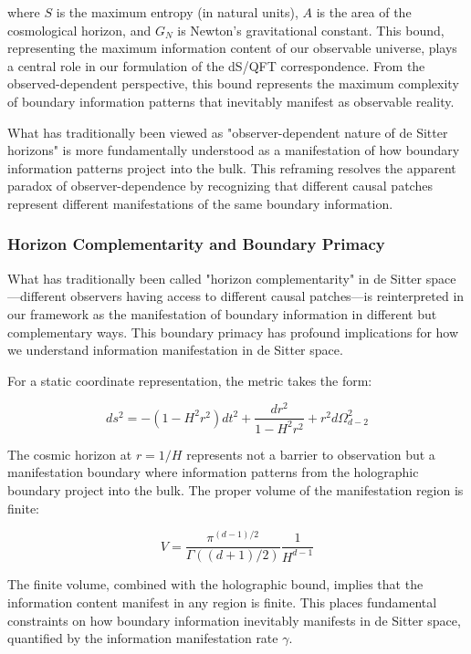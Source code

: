 \documentclass[11pt,english,twoside]{article}
\theoremstyle{plain}
\theoremstyle{definition}
\theoremstyle{remark}
\newcommand{\gammaR}{\gamma}
\begin{document}
where $S$ is the maximum entropy (in natural units), $A$ is the area of the cosmological horizon, and $G_N$ is Newton's gravitational constant. This bound, representing the maximum information content of our observable universe, plays a central role in our formulation of the dS/QFT correspondence. From the observed-dependent perspective, this bound represents the maximum complexity of boundary information patterns that inevitably manifest as observable reality.

What has traditionally been viewed as "observer-dependent nature of de Sitter horizons" is more fundamentally understood as a manifestation of how boundary information patterns project into the bulk. This reframing resolves the apparent paradox of observer-dependence by recognizing that different causal patches represent different manifestations of the same boundary information.

\subsubsection{Horizon Complementarity and Boundary Primacy}

What has traditionally been called "horizon complementarity" in de Sitter space—different observers having access to different causal patches—is reinterpreted in our framework as the manifestation of boundary information in different but complementary ways. This boundary primacy has profound implications for how we understand information manifestation in de Sitter space.

For a static coordinate representation, the metric takes the form:

\begin{equation}
\label{eq:ds_metric_static}
ds^2 = -(1-H^2r^2)dt^2 + \frac{dr^2}{1-H^2r^2} + r^2d\Omega_{d-2}^2
\end{equation}

The cosmic horizon at $r = 1/H$ represents not a barrier to observation but a manifestation boundary where information patterns from the holographic boundary project into the bulk. The proper volume of the manifestation region is finite:

\begin{equation}
\label{eq:ds_volume}
V = \frac{\pi^{(d-1)/2}}{\Gamma((d+1)/2)}\frac{1}{H^{d-1}}
\end{equation}

The finite volume, combined with the holographic bound, implies that the information content manifest in any region is finite. This places fundamental constraints on how boundary information inevitably manifests in de Sitter space, quantified by the information manifestation rate $\gammaR$.
\end{document}
